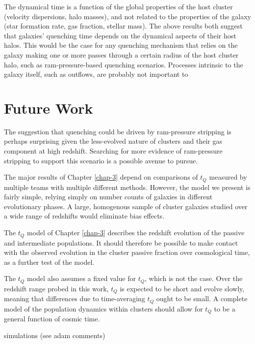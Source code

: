The dynamical time is a function of the global properties of the host cluster (velocity dispersions, halo masses), and not related to the properties of the galaxy (star formation rate, gas fraction, stellar mass).
The above results both suggest that galaxies' quenching time depends on the dynamical aspects of their host halos.
This would be the case for any quenching mechanism that relies on the galaxy making one or more passes through a certain radius of the host cluster halo, such as ram-pressure-based quenching scenarios.
Processes intrinsic to the galaxy itself, such as outflows, are probably not important to


\section{Future Work}

The suggestion that quenching could be driven by ram-pressure stripping is perhaps surprising given the less-evolved nature of clusters and their gas component at high redshift.
Searching for more evidence of ram-pressure stripping to support this scenario is a possible avenue to pursue.


The major results of Chapter \ref{chap-3} depend on comparisons of $t_Q$ measured by multiple teams with multiple different methods.
However, the model we present is fairly simple, relying simply on number counts of galaxies in different evolutionary phases.
A large, homogenous sample of cluster galaxies studied over a wide range of redshifts would eliminate bias effects.

The $t_Q$ model of Chapter \ref{chap-3} describes the redshift evolution of the passive and intermediate populations.
It should therefore be possible to make contact with the observed evolution in the cluster passive fraction over cosmological time, as a further test of the model.

The $t_Q$ model also assumes a fixed value for $t_Q$, which is not the case.
Over the redshift range probed in this work, $t_Q$ is expected to be short and evolve slowly, meaning that differences due to time-averaging $t_Q$ ought to be small.
A complete model of the population dynamics within clusters should allow for $t_Q$ to be a general function of cosmic time.


simulations (see adam comments)
